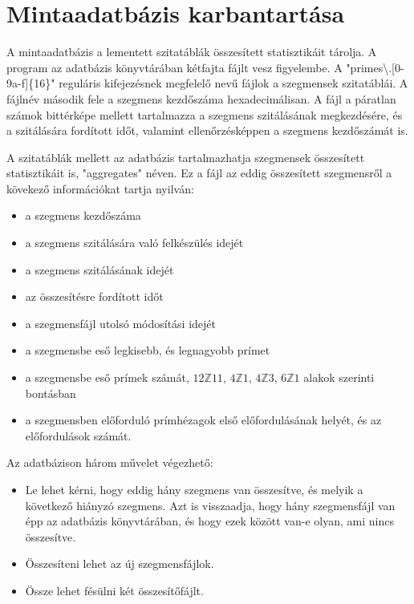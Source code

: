 \documentclass[12pt]{report}
\begin{document}
\section{Mintaadatbázis karbantartása}

A mintaadatbázis a lementett szitatáblák összesített statisztikáit tárolja.
A program az adatbázis könyvtárában kétfajta fájlt vesz figyelembe.  %
A "primes\textbackslash.[0-9a-f]\{16\}" reguláris kifejezésnek megfelelő nevű  %
fájlok a szegmensek szitatáblái.
A fájlnév második fele a szegmens kezdőszáma hexadecimálisan.
A fájl a páratlan számok bittérképe mellett tartalmazza a szegmens
szitálásának megkezdésére, és a szitálására fordított időt,
valamint ellenőrzésképpen a szegmens kezdőszámát is.

A szitatáblák mellett az adatbázis tartalmazhatja szegmensek összesített
statisztikáit is, "aggregates" néven. Ez a fájl az eddig összesített  %
szegmensről a kövekező információkat tartja nyilván:
\begin{itemize}
\item a szegmens kezdőszáma
\item a szegmens szitálására való felkészülés idejét
\item a szegmens szitálásának idejét
\item az összesítésre fordított időt
\item a szegmensfájl utolsó módosítási idejét
\item a szegmensbe eső legkisebb, és legnagyobb prímet
\item a szegmensbe eső prímek számát,
$12\mathbb{Z}11$, $4\mathbb{Z}1$, $4\mathbb{Z}3$, $6\mathbb{Z}1$ alakok szerinti bontásban %
\item a szegmensben előforduló prímhézagok első előfordulásának helyét,
és az előfordulások számát.
\end{itemize}

Az adatbázison három művelet végezhető:
\begin{itemize}

\item Le lehet kérni, hogy eddig hány szegmens van összesítve,
és melyik a következő hiányzó szegmens.
Azt is visszaadja, hogy hány szegmensfájl van épp az adatbázis könyvtárában,
és hogy ezek között van-e olyan, ami nincs összesítve.  %

\item Összesíteni lehet az új szegmensfájlok.  %

\item Össze lehet fésülni két összesítőfájlt.

\end{itemize}
\end{document}
